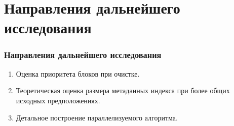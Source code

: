 \documentclass[aspectratio=169, pdf, 8pt, unicode]{beamer}
\begin{document}
\section{Направления дальнейшего исследования}

\begin{frame}[fragile]
\frametitle{Направления дальнейшего исследования}
\begin{enumerate}
\item Оценка приоритета блоков при очистке.
\item Теоретическая оценка размера метаданных индекса при более общих
исходных предположениях.
\item Детальное построение параллелизуемого алгоритма.
\end{enumerate}
\end{frame}
\end{document}
